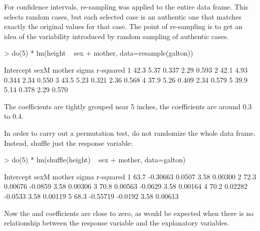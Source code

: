 For confidence intervals, re-sampling was applied to the entire data
frame.  This selects random cases, but each selected case is an
authentic one that matches exactly the original values for that case.
The point of re-sampling is to get an idea of the variability
introduced by random sampling of authentic cases.
\begin{Schunk}
\begin{Sinput}
> do(5) * lm(height ~ sex + mother, data=resample(galton))
\end{Sinput}
\begin{Soutput}
  Intercept sexM mother sigma r-squared
1      42.3 5.37  0.337  2.29     0.593
2      42.1 4.93  0.344  2.34     0.550
3      43.5 5.23  0.321  2.36     0.568
4      37.9 5.26  0.409  2.34     0.579
5      39.9 5.14  0.378  2.29     0.570
\end{Soutput}
\end{Schunk}
The  coefficients are tightly grouped near 5
inches, the  coefficients are around 0.3 to 0.4.



In order to carry out a permutation test, do not randomize the
whole data frame.  Instead, shuffle just the response variable:
\begin{Schunk}
\begin{Sinput}
> do(5) * lm(shuffle(height) ~ sex + mother, data=galton)
\end{Sinput}
\begin{Soutput}
  Intercept     sexM  mother sigma r-squared
1      63.7 -0.30663  0.0507  3.58   0.00300
2      72.3  0.00676 -0.0859  3.58   0.00306
3      70.8  0.00563 -0.0629  3.58   0.00164
4      70.2  0.02282 -0.0533  3.58   0.00119
5      68.3 -0.55719 -0.0192  3.58   0.00613
\end{Soutput}
\end{Schunk}
Now the  and  
coefficients are close to zero, as would be expected when
there is no relationship between the response variable and the
explanatory variables.

